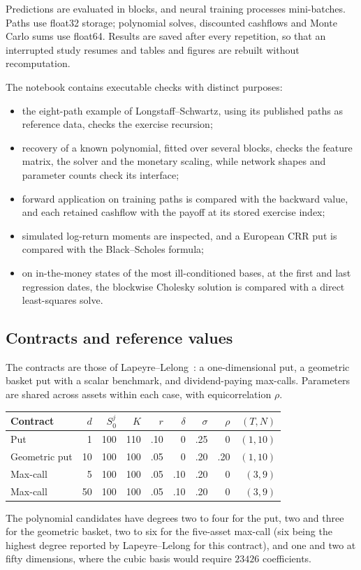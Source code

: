 \documentclass[11pt,a4paper]{article}
\begin{document}
Predictions are evaluated in blocks, and neural training processes mini-batches.
Paths use float32 storage; polynomial solves, discounted cashflows and Monte Carlo
sums use float64. Results are saved after every repetition, so that an interrupted
study resumes and tables and figures are rebuilt without recomputation.

The notebook contains executable checks with distinct purposes:
\begin{itemize}
 \item the eight-path example of Longstaff--Schwartz, using its published
 paths as reference data, checks the exercise recursion;
 \item recovery of a known polynomial, fitted over several blocks, checks the
 feature matrix, the solver and the monetary scaling, while network shapes and
 parameter counts check its interface;
 \item forward application on training paths is compared with the backward
 value, and each retained cashflow with the payoff at its stored exercise index;
 \item simulated log-return moments are inspected, and a European CRR put
 is compared with the Black--Scholes formula;
 \item on in-the-money states of the most ill-conditioned bases, at the first and last
 regression dates, the blockwise Cholesky solution is
 compared with a direct least-squares solve.
\end{itemize}
\subsection{Contracts and reference values}
The contracts are those of Lapeyre--Lelong~\cite[Tables 1, 3 and 9--11]{LL}:
a one-dimensional put, a geometric basket put with a scalar benchmark, and
dividend-paying max-calls. Parameters are shared across assets within each case,
with equicorrelation $\rho$.
\begin{center}
\small
\begin{tabular}{lrrrrrrrr}
\toprule
Contract & $d$ & $S_0^j$ & $K$ & $r$ & $\delta$ & $\sigma$ & $\rho$ & $(T,N)$\\
\midrule
Put & 1 & 100 & 110 & .10 & 0 & .25 & 0 & $(1,10)$\\
Geometric put & 10 & 100 & 100 & .05 & 0 & .20 & .20 & $(1,10)$\\
Max-call & 5 & 100 & 100 & .05 & .10 & .20 & 0 & $(3,9)$\\
Max-call & 50 & 100 & 100 & .05 & .10 & .20 & 0 & $(3,9)$\\
\bottomrule
\end{tabular}
\end{center}
The polynomial candidates have degrees two to four for the put, two and three for the
geometric basket, two to six for the five-asset max-call (six being the highest degree
reported by Lapeyre--Lelong for this contract), and one and two at fifty dimensions,
where the cubic basis would require $23426$ coefficients.
\end{document}
